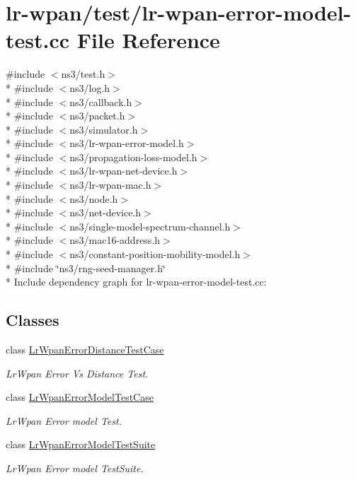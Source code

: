 \hypertarget{lr-wpan-error-model-test_8cc}{}\section{lr-\/wpan/test/lr-\/wpan-\/error-\/model-\/test.cc File Reference}
\label{lr-wpan-error-model-test_8cc}
{\ttfamily \#include $<$ns3/test.\+h$>$}\\*
{\ttfamily \#include $<$ns3/log.\+h$>$}\\*
{\ttfamily \#include $<$ns3/callback.\+h$>$}\\*
{\ttfamily \#include $<$ns3/packet.\+h$>$}\\*
{\ttfamily \#include $<$ns3/simulator.\+h$>$}\\*
{\ttfamily \#include $<$ns3/lr-\/wpan-\/error-\/model.\+h$>$}\\*
{\ttfamily \#include $<$ns3/propagation-\/loss-\/model.\+h$>$}\\*
{\ttfamily \#include $<$ns3/lr-\/wpan-\/net-\/device.\+h$>$}\\*
{\ttfamily \#include $<$ns3/lr-\/wpan-\/mac.\+h$>$}\\*
{\ttfamily \#include $<$ns3/node.\+h$>$}\\*
{\ttfamily \#include $<$ns3/net-\/device.\+h$>$}\\*
{\ttfamily \#include $<$ns3/single-\/model-\/spectrum-\/channel.\+h$>$}\\*
{\ttfamily \#include $<$ns3/mac16-\/address.\+h$>$}\\*
{\ttfamily \#include $<$ns3/constant-\/position-\/mobility-\/model.\+h$>$}\\*
{\ttfamily \#include \char`\"{}ns3/rng-\/seed-\/manager.\+h\char`\"{}}\\*
Include dependency graph for lr-\/wpan-\/error-\/model-\/test.cc\+:
\subsection*{Classes}
\begin{DoxyCompactItemize}
\item 
class \hyperlink{classLrWpanErrorDistanceTestCase}{Lr\+Wpan\+Error\+Distance\+Test\+Case}
\begin{DoxyCompactList}\small\item\em Lr\+Wpan Error Vs Distance Test. \end{DoxyCompactList}\item 
class \hyperlink{classLrWpanErrorModelTestCase}{Lr\+Wpan\+Error\+Model\+Test\+Case}
\begin{DoxyCompactList}\small\item\em Lr\+Wpan Error model Test. \end{DoxyCompactList}\item 
class \hyperlink{classLrWpanErrorModelTestSuite}{Lr\+Wpan\+Error\+Model\+Test\+Suite}
\begin{DoxyCompactList}\small\item\em Lr\+Wpan Error model Test\+Suite. \end{DoxyCompactList}\end{DoxyCompactItemize}
